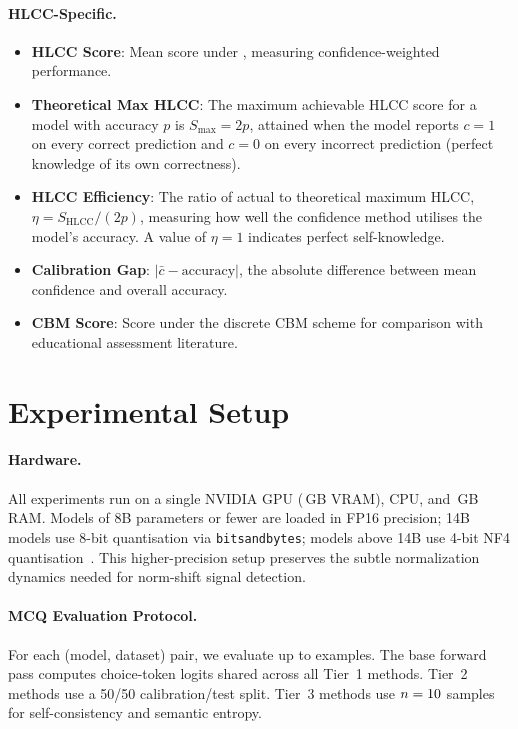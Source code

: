 \documentclass[11pt,a4paper]{article}
\begin{document}
\paragraph{HLCC-Specific.}
\begin{itemize}[nosep]
  \item \textbf{HLCC Score}: Mean score under
        , measuring confidence-weighted
        performance.
  \item \textbf{Theoretical Max HLCC}: The maximum achievable HLCC
        score for a model with accuracy $p$ is $S_{\max} = 2p$,
        attained when the model reports $c = 1$ on every correct
        prediction and $c = 0$ on every incorrect prediction (perfect
        knowledge of its own correctness).
  \item \textbf{HLCC Efficiency}: The ratio of actual to theoretical
        maximum HLCC, $\eta = S_{\text{HLCC}} / (2p)$, measuring how
        well the confidence method utilises the model's accuracy.
        A value of $\eta = 1$ indicates perfect self-knowledge.
  \item \textbf{Calibration Gap}: $|\bar{c} - \text{accuracy}|$, the
        absolute difference between mean confidence and overall accuracy.
  \item \textbf{CBM Score}: Score under the discrete CBM scheme for
        comparison with educational assessment literature.
\end{itemize}


\section{Experimental Setup}
\label{sec:setup}

\paragraph{Hardware.}
All experiments run on a single NVIDIA \hwGPU{} GPU
(\hwVRAM{}\,GB VRAM), \hwCPU{} CPU, and \hwRAM{}\,GB RAM.
Models of 8B parameters or fewer are loaded in FP16 precision;
14B models use 8-bit quantisation via \texttt{bitsandbytes};
models above 14B use 4-bit NF4 quantisation~\cite{dettmers2023qlora}.
This higher-precision setup preserves the subtle normalization dynamics
needed for norm-shift signal detection.

\paragraph{MCQ Evaluation Protocol.}
For each (model, dataset) pair, we evaluate up to \expCalibrationExamples{} examples.  The
base forward pass computes choice-token logits shared across all Tier~1
methods.  Tier~2 methods use a 50/50 calibration/test split.  Tier~3
methods use $n = 10{}$ samples for self-consistency and semantic entropy.
\end{document}
